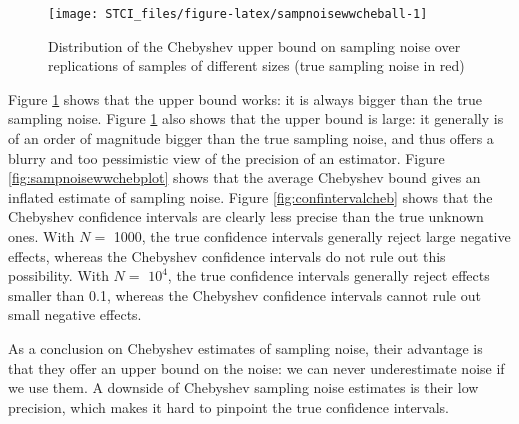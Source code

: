 \documentclass[
]{book}
\theoremstyle{definition}
\theoremstyle{definition}
\theoremstyle{definition}
\theoremstyle{definition}
\theoremstyle{remark}
\begin{document}
\begin{figure}[htbp]

{\centering \texttt{[image: STCI\_files/figure-latex/sampnoisewwcheball-1]} 

}

\caption{Distribution of the Chebyshev upper bound on sampling noise over replications of samples of different sizes (true sampling noise in red)}\label{fig:sampnoisewwcheball}
\end{figure}

Figure \ref{fig:sampnoisewwcheball} shows that the upper bound works: it is always bigger than the true sampling noise.
Figure \ref{fig:sampnoisewwcheball} also shows that the upper bound is large: it generally is of an order of magnitude bigger than the true sampling noise, and thus offers a blurry and too pessimistic view of the precision of an estimator.
Figure \ref{fig:sampnoisewwchebplot} shows that the average Chebyshev bound gives an inflated estimate of sampling noise.
Figure \ref{fig:confintervalcheb} shows that the Chebyshev confidence intervals are clearly less precise than the true unknown ones.
With \(N=\) 1000, the true confidence intervals generally reject large negative effects, whereas the Chebyshev confidence intervals do not rule out this possibility.
With \(N=\) \ensuremath{10^{4}}, the true confidence intervals generally reject effects smaller than 0.1, whereas the Chebyshev confidence intervals cannot rule out small negative effects.

As a conclusion on Chebyshev estimates of sampling noise, their advantage is that they offer an upper bound on the noise: we can never underestimate noise if we use them.
A downside of Chebyshev sampling noise estimates is their low precision, which makes it hard to pinpoint the true confidence intervals.
\end{document}
